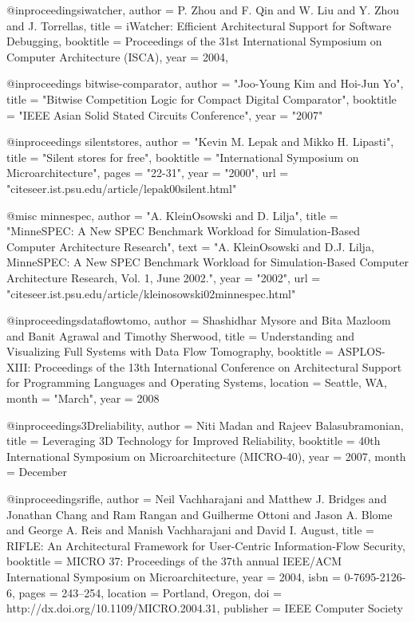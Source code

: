 @inproceedings{iwatcher,
 author = {P. Zhou and F. Qin and W. Liu and Y. Zhou and J. Torrellas},
 title = {{iWatcher: Efficient Architectural Support for Software Debugging}},
 booktitle = {Proceedings of the 31st International Symposium on Computer Architecture (ISCA)},
 year = {2004},
 }


@inproceedings{ bitwise-comparator,
    author = "Joo-Young Kim and Hoi-Jun Yo",
    title = "Bitwise Competition Logic for Compact Digital Comparator",
    booktitle = "IEEE Asian Solid Stated Circuits Conference",
    year = "2007"
}


@inproceedings{ silentstores,
    author = "Kevin M. Lepak and Mikko H. Lipasti",
    title = "Silent stores for free",
    booktitle = "International Symposium on Microarchitecture",
    pages = "22-31",
    year = "2000",
    url = "citeseer.ist.psu.edu/article/lepak00silent.html" 
}


@misc{ minnespec,
  author = "A. KleinOsowski and D. Lilja",
  title = "MinneSPEC: A New SPEC Benchmark Workload for Simulation-Based Computer
    Architecture Research",
  text = "A. KleinOsowski and D.J. Lilja, MinneSPEC: A New SPEC Benchmark Workload
    for Simulation-Based Computer Architecture Research, Vol. 1, June 2002.",
  year = "2002",
  url = "citeseer.ist.psu.edu/article/kleinosowski02minnespec.html" }

@inproceedings{dataflowtomo,
   author = {Shashidhar Mysore and Bita Mazloom and Banit Agrawal and Timothy Sherwood},
   title = {{ Understanding and Visualizing Full Systems with Data Flow Tomography}},
   booktitle = {ASPLOS-XIII: Proceedings of the 13th International Conference on Architectural Support for Programming Languages and Operating Systems},
   location = {Seattle, WA},
   month = "March",
   year = {2008} 
} 

@inproceedings{3Dreliability,
  author = {Niti Madan and Rajeev Balasubramonian},
  title = {{ Leveraging 3D Technology for Improved Reliability}},
  booktitle = {{40th International Symposium on Microarchitecture (MICRO-40)}},
  year = 2007,
  month = December
}

@inproceedings{rifle,
 author = {Neil Vachharajani and Matthew J. Bridges and Jonathan Chang and Ram Rangan and Guilherme Ottoni and Jason A. Blome and George A. Reis and Manish Vachharajani and David I. August},
 title = {RIFLE: An Architectural Framework for User-Centric Information-Flow Security},
 booktitle = {MICRO 37: Proceedings of the 37th annual IEEE/ACM International Symposium on Microarchitecture},
 year = {2004},
 isbn = {0-7695-2126-6},
 pages = {243--254},
 location = {Portland, Oregon},
 doi = {http://dx.doi.org/10.1109/MICRO.2004.31},
 publisher = {IEEE Computer Society}
}

